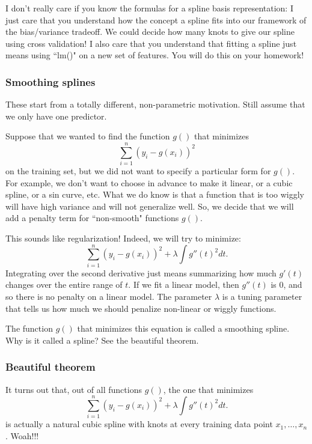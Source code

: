 I don't really care if you know the formulas for a spline basis representation: I just care that you understand how the concept a spline fits into our framework of the bias/variance tradeoff. We could decide how many knots to give our spline using cross validation! I also care that you understand that fitting a spline just means using ``lm()" on a new set of features. You will do this on your homework!

\subsubsection{Smoothing splines}

These start from a totally different, non-parametric motivation. Still assume that we only have one predictor. 

Suppose that we wanted to find the function $g()$ that minimizes
$$
\sum_{i=1}^n (y_i - g(x_i))^2
$$
on the training set, but we did not want to specify a particular form for $g()$. For example, we don't want to choose in advance to make it linear, or a cubic spline, or a sin curve, etc. What we do know is that a function that is too wiggly will have high variance and will not generalize well. So, we decide that we will add a penalty term for ``non-smooth" functions $g()$.

This sounds like regularization! Indeed, we will try to minimize:
$$
\sum_{i=1}^n (y_i - g(x_i))^2 + \lambda \int g''(t)^2 dt.
$$
Integrating over the second derivative just means summarizing how much $g'(t)$ changes over the entire range of $t$. If we fit a linear model, then $g''(t)$ is $0$, and so there is no penalty on a linear model. The parameter $\lambda$ is a tuning parameter that tells us how much we should penalize non-linear or wiggly functions. 

The function $g()$ that minimizes this equation is called a smoothing spline. Why is it called a spline? See the beautiful theorem. 

\subsubsection{Beautiful theorem}

It turns out that, out of all functions $g()$, the one that minimizes 
$$
\sum_{i=1}^n (y_i - g(x_i))^2 + \lambda \int g''(t)^2 dt.
$$
is actually a natural cubic spline with knots at every training data point $x_1,\ldots, x_n$. Woah!!!

